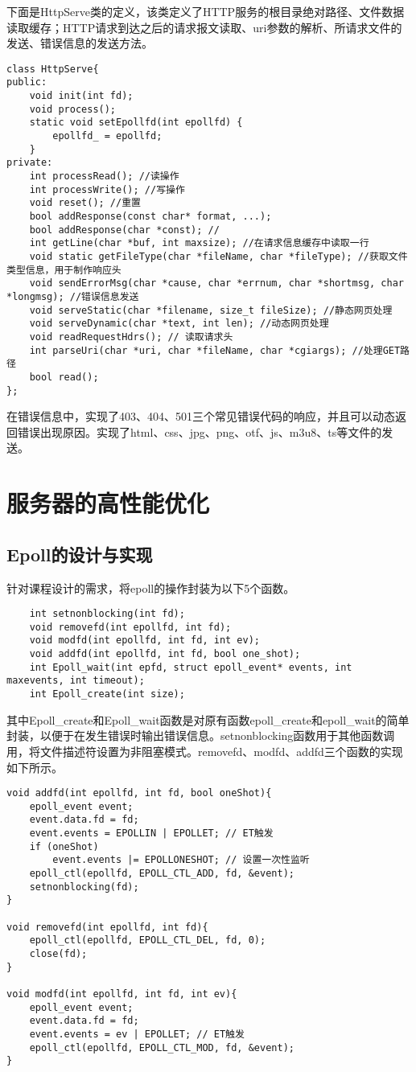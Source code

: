 \documentclass[bachelor]{thesis-uestc}
\begin{document}
下面是HttpServe类的定义，该类定义了HTTP服务的根目录绝对路径、文件数据读取缓存；HTTP请求到达之后的请求报文读取、uri参数的解析、所请求文件的发送、错误信息的发送方法。
\begin{lstlisting}
class HttpServe{
public:
	void init(int fd);
	void process();
	static void setEpollfd(int epollfd) {
		epollfd_ = epollfd;
	}
private:
	int processRead(); //读操作
	int processWrite(); //写操作
	void reset(); //重置
	bool addResponse(const char* format, ...); 
	bool addResponse(char *const); //
	int getLine(char *buf, int maxsize); //在请求信息缓存中读取一行
	void static getFileType(char *fileName, char *fileType); //获取文件类型信息，用于制作响应头
	void sendErrorMsg(char *cause, char *errnum, char *shortmsg, char *longmsg); //错误信息发送
	void serveStatic(char *filename, size_t fileSize); //静态网页处理
	void serveDynamic(char *text, int len); //动态网页处理
	void readRequestHdrs(); // 读取请求头
	int parseUri(char *uri, char *fileName, char *cgiargs); //处理GET路径
	bool read();
};
\end{lstlisting}

在错误信息中，实现了403、404、501三个常见错误代码的响应，并且可以动态返回错误出现原因。实现了html、css、jpg、png、otf、js、m3u8、ts等文件的发送。

\section{服务器的高性能优化}

\subsection{Epoll的设计与实现}
针对课程设计的需求，将epoll的操作封装为以下5个函数。

\begin{lstlisting}
	int setnonblocking(int fd);
	void removefd(int epollfd, int fd);
	void modfd(int epollfd, int fd, int ev);
	void addfd(int epollfd, int fd, bool one_shot);
	int Epoll_wait(int epfd, struct epoll_event* events, int maxevents, int timeout);
	int Epoll_create(int size);
\end{lstlisting}

其中Epoll\_create和Epoll\_wait函数是对原有函数epoll\_create和epoll\_wait的简单封装，以便于在发生错误时输出错误信息。setnonblocking函数用于其他函数调用，将文件描述符设置为非阻塞模式。removefd、modfd、addfd三个函数的实现如下所示。
\begin{lstlisting}
void addfd(int epollfd, int fd, bool oneShot){
	epoll_event event;
	event.data.fd = fd;
	event.events = EPOLLIN | EPOLLET; // ET触发 
	if (oneShot)
		event.events |= EPOLLONESHOT; // 设置一次性监听 
	epoll_ctl(epollfd, EPOLL_CTL_ADD, fd, &event);
	setnonblocking(fd);
}

void removefd(int epollfd, int fd){
	epoll_ctl(epollfd, EPOLL_CTL_DEL, fd, 0);
	close(fd);
}

void modfd(int epollfd, int fd, int ev){
	epoll_event event;
	event.data.fd = fd;
	event.events = ev | EPOLLET; // ET触发 
	epoll_ctl(epollfd, EPOLL_CTL_MOD, fd, &event);
}
\end{lstlisting}
\end{document}
